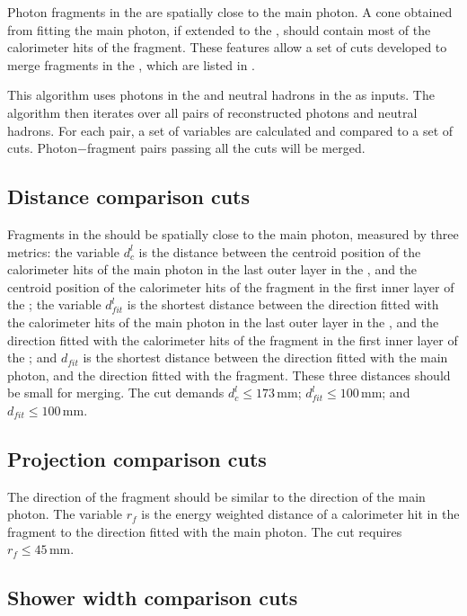 Photon fragments in the \HCAL are  spatially close to the main photon. A cone obtained from fitting the main photon, if extended to the \HCAL, should contain most of the calorimeter hits of the fragment. These features allow a set of cuts developed to merge  fragments in the \HCAL, which are listed in .


This algorithm uses photons in the \ECAL and neutral hadrons in the \HCAL as inputs. The algorithm then iterates over all pairs of reconstructed photons and neutral hadrons. For each pair, a set of variables are calculated and compared to a set of cuts. Photon$-$fragment pairs passing all the cuts will be merged.

\subsection{Distance comparison cuts}

Fragments in the \HCAL should be spatially close to the main photon, measured by three metrics: the variable $d^l_c$ is the distance between the centroid position of the calorimeter hits of the main photon in the last outer layer in the \ECAL, and the centroid position of the calorimeter hits of the fragment in the first inner layer of the \HCAL; the variable $d^l_{fit}$ is the shortest distance between the direction fitted with the calorimeter hits of the main photon in the  last outer layer in the \ECAL, and the direction fitted with  the calorimeter hits of the fragment in the first inner layer of the \HCAL; and $d_{fit}$ is the shortest distance between the direction fitted with the main photon, and the direction fitted with the fragment. These three distances should be small for merging. The cut demands $d^l_c \leqslant 173\,\text{mm}$; $d^l_{fit} \leqslant 100\,\text{mm}$; and $d_{fit} \leqslant 100\,\text{mm}$.

\subsection{Projection comparison cuts}

The direction of the fragment should be similar to the direction of the main photon. The variable  $r_f$ is the energy weighted \rms  distance of a calorimeter hit in the fragment to the direction fitted with the main photon.  The cut requires $ r_f \leqslant 45\,\text{mm}$.

\subsection{Shower width comparison cuts}

